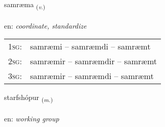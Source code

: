 \documentclass[frontgrid, backgrid]{flacards}\usepackage[]{graphicx}\usepackage[]{color}
\begin{document}
\renewcommand{\flhead}{\vskip5pt \fboxsep=0pt {\small\bfseries\footnotesize Sagnorð | Verb}}
\renewcommand{\fcfoot}{\vskip5pt \fboxsep=0pt \hspace{2pt}{\small\bfseries\footnotesize 2K}}

\renewcommand{\blhead}{\vskip5pt {\small\bfseries\footnotesize Sagnorð | Verb }}
\renewcommand{\bcfoot}{\vskip5pt \hspace{2pt}{\small\bfseries\footnotesize 2K}}


{samræma \small{\textsubscript{(\textit{v.})}} \\[1ex] %
\textphonetic{[samraima]} \\
en: \emph{coordinate, standardize} \\  [2ex]
\renewcommand*{\arraystretch}{0.8}
\begin{tabular}{p{1cm}l}
\textsc{1sg}: & samræmi -- samræmdi -- samræmt \\ 
\textsc{2sg}: & samræmir -- samræmdir -- samræmt \\ 
\textsc{3sg}: & samræmir -- samræmdi -- samræmt \\ 
\end{tabular}
}

\renewcommand{\flhead}{\vskip5pt \fboxsep=0pt {\small\bfseries\footnotesize Nafnorð | Noun}}
\renewcommand{\fcfoot}{\vskip5pt \fboxsep=0pt \hspace{2pt}{\small\bfseries\footnotesize 2K}}

\renewcommand{\blhead}{\vskip5pt {\small\bfseries\footnotesize Nafnorð | Noun }}
\renewcommand{\bcfoot}{\vskip5pt \hspace{2pt}{\small\bfseries\footnotesize 2K}}


{starfshópur \small{\textsubscript{(\textit{m.})}} \\[1ex] %
\textphonetic{[starfshoupʏr]} \\
en: \emph{working group} \\  [2ex]
\renewcommand*{\arraystretch}{0.8}
}
\end{document}
